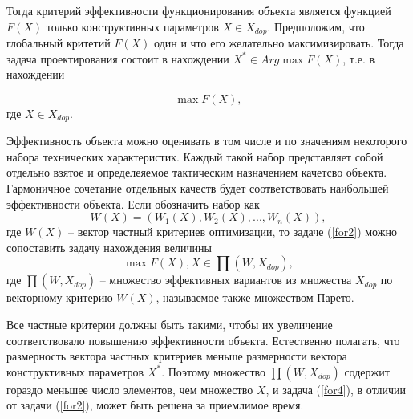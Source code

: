 Тогда критерий эффективности функционирования объекта является функцией \begin{math} F(X)\end{math} только конструктивных параметров \begin{math} X \in X_{dop}\end{math}. Предположим, что глобальный критетий \begin{math} F(X)\end{math} один и что его желательно максимизировать. Тогда задача проектирования состоит в нахождении \begin{math} X^* \in Arg \max F(X)\end{math}, т.е. в нахождении

\begin{equation} \label{for2}
\max F(X),
\end{equation}
где \begin{math} X \in X_{dop}\end{math}.

Эффективность объекта можно оценивать в том числе и по значениям некоторого набора технических характеристик. Каждый такой набор представляет собой отдельно взятое и определеяемое тактическим назначением качетсво объекта. Гармоничное сочетание отдельных качеств будет соответствовать наибольшей эффективности объекта. Если обозначить набор как 
\begin{equation} \label{for3}
W(X) = (W_1(X), W_2(X), ... , W_n(X)),
\end{equation}
где \begin{math} W(X)\end{math} -- вектор частный критериев оптимизации, то задаче (\ref{for2}) можно сопоставить задачу нахождения величины
\begin{equation} \label{for4}
\max F(X), X \in \prod (W, X_{dop}),
\end{equation}
где \begin{math} \prod (W, X_{dop})\end{math} -- множество эффективных вариантов из множества \begin{math}X_{dop}\end{math} по векторному критерию \begin{math}W(X)\end{math}, называемое также множеством Парето. 

Все частные критерии должны быть такими, чтобы их увеличение соответствовало повышению эффективности объекта. Естественно полагать, что размерность вектора частных критериев меньше размерности вектора конструктивных параметров \begin{math} X^*\end{math}. Поэтому множество \begin{math} \prod (W, X_{dop})\end{math} содержит гораздо меньшее число элементов, чем множество $X$, и задача (\ref{for4}), в отличии от задачи (\ref{for2}), может быть решена за приемлимое время.

